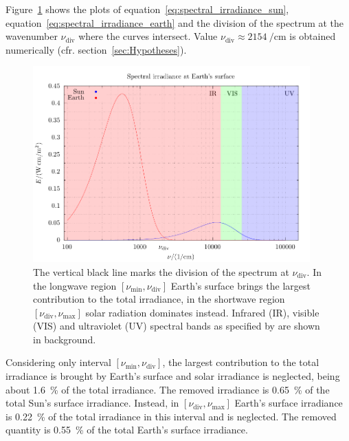 \documentclass[a4paper,10pt,twocolumn,\classoptions]{article}
\begin{document}
Figure~\ref{fig:spectral_irradiance} shows the plots of equation~\eqref{eq:spectral_irradiance_sun}, equation~\eqref{eq:spectral_irradiance_earth} and the division of the spectrum at the wavenumber $\nu_\text{div}$ where the curves intersect. Value $\nu_\text{div} \approx \qty{2154}{\per\centi\metre}$ is obtained numerically (cfr. section~\ref{sec:Hypotheses}).
\begin{figure}[h]
  \centering
  \includegraphics*[keepaspectratio=true,width=0.95\textwidth]{spectral_irradiance_bands}
  \caption{The vertical black line marks the division of the spectrum at $\nu_\text{div}$. In the longwave region $[\nu_\text{min}, \nu_\text{div}]$ Earth's surface brings the largest contribution to the total irradiance, in the shortwave region $[\nu_\text{div}, \nu_\text{max}]$ solar radiation dominates instead. Infrared (IR), visible (VIS) and ultraviolet (UV) spectral bands as specified by \cite{CIE} are shown in background.}
  \label{fig:spectral_irradiance}
\end{figure}

Considering only interval $[\nu_\text{min}, \nu_\text{div}]$, the largest contribution to the total irradiance is brought by Earth's surface and solar irradiance is neglected, being about \qty{1.6}{\percent} of the total irradiance. The removed irradiance is \qty{0.65}{\percent} of the total Sun's surface irradiance. %
Instead, in $[\nu_\text{div}, \nu_\text{max}]$ Earth's surface irradiance is \qty{0.22}{\percent} of the total irradiance in this interval and is neglected. The removed quantity is \qty{0.55}{\percent} of the total Earth's surface irradiance. %
\end{document}

